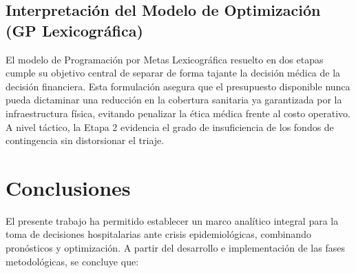 \documentclass[conference]{IEEEtran}
\begin{document}
\subsection{Interpretación del Modelo de Optimización (GP Lexicográfica)}
El modelo de Programación por Metas Lexicográfica resuelto en dos etapas cumple su objetivo central de separar de forma tajante la decisión médica de la decisión financiera. Esta formulación asegura que el presupuesto disponible nunca pueda dictaminar una reducción en la cobertura sanitaria ya garantizada por la infraestructura física, evitando penalizar la ética médica frente al costo operativo. A nivel táctico, la Etapa 2 evidencia el grado de insuficiencia de los fondos de contingencia sin distorsionar el triaje.

\section{Conclusiones}

El presente trabajo ha permitido establecer un marco analítico integral para la toma de decisiones hospitalarias ante crisis epidemiológicas, combinando pronósticos y optimización. A partir del desarrollo e implementación de las fases metodológicas, se concluye que:
\end{document}
